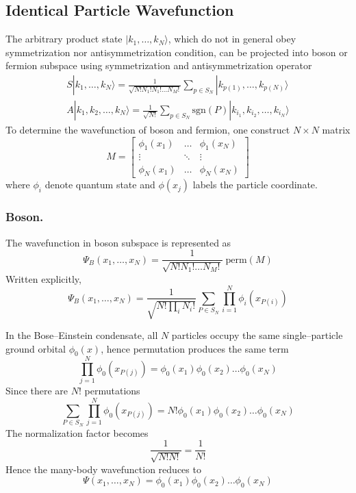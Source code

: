 \documentclass[../../../main.tex]{subfiles}
\begin{document}
\subsection{Identical Particle Wavefunction}
The arbitrary product state $  |k_1, \ldots, k_N\rangle$, which do not in general obey symmetrization nor antisymmetrization condition, can be projected into boson or fermion subspace using symmetrization and antisymmetrization operator
\begin{gather*}
  S |k_1, \ldots, k_N \rangle =
  \frac{1}{\sqrt{N!N_1! N_1! \ldots N_M!}}
  \sum_{p \in S_N} |k_{p(1)}, \ldots, k_{p(N)} \rangle  \\
  A|k_1,k_2,\ldots,k_N\rangle = \frac{1}{\sqrt{N!}} \sum_{p \in S_N} \mathrm{sgn}(P) |k_{i_1},k_{i_2},\ldots,k_{i_N}\rangle
\end{gather*}
To determine the wavefunction of boson and fermion, one construct $N \times N$ matrix
\begin{equation*}
  M =
  \begin{bmatrix}
    \phi_1(x_1) & \ldots & \phi_1(x_N) \\
    \vdots      & \ddots & \vdots      \\
    \phi_N(x_1) & \ldots & \phi_N(x_N)
  \end{bmatrix}
\end{equation*}
where $\phi_i $ denote quantum state and $\phi(x_j)$ labels the particle coordinate.

\subsubsection{Boson.}
The wavefunction  in boson subspace is represented as
\begin{equation*}
  \Psi_B(x_1, \ldots, x_N) = \frac{1}{\sqrt{N!N_1! \ldots N_M!}} \;\mathrm{perm}(M)
\end{equation*}
Written explicitly,
\begin{equation*}
  \Psi_B(x_1, \ldots, x_N)
  = \frac{1}{\sqrt{N!\prod_i N_i!}} \sum_{P \in S_N} \prod_{i=1}^N \phi_i(x_{P(i)})
\end{equation*}

In the Bose–Einstein condensate, all $N$ particles occupy the same single–particle ground orbital $\phi_0(x)$, hence permutation produces the same term
\begin{equation*}
  \prod_{j=1}^{N} \phi_0(x_{P(j)}) = \phi_0(x_1)\phi_0(x_2)\ldots\phi_0(x_N)
\end{equation*}
Since there are $N!$ permutations
\begin{equation*}
  \sum_{P\in S_N} \prod_{j=1}^{N} \phi_0(x_{P(j)}) = N! \phi_0(x_1)\phi_0(x_2)\ldots\phi_0(x_N)
\end{equation*}
The normalization factor becomes
\begin{equation*}
  \frac{1}{\sqrt{N!N!}} = \frac{1}{N!}
\end{equation*}
Hence the many-body wavefunction reduces to
\begin{equation*}
  \Psi(x_1,\ldots,x_N) = \phi_0(x_1)\phi_0(x_2)\ldots\phi_0(x_N)
\end{equation*}
\end{document}
